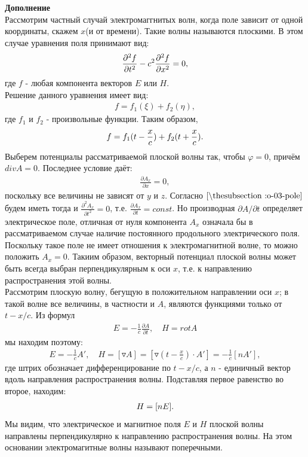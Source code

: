 ﻿\documentclass[__main__.tex]{subfiles}
\begin{document}
\textbf{Дополнение}\\
Рассмотрим частный случай электромаггнитых волн, когда поле зависит от одной координаты, скажем $x$(и от времени). Такие волны называются плоскими. В этом случае уравнения поля принимают вид:
\begin{gather}
\llabel{o-03-pole}
\frac{\partial^2f}{\partial t^2} - c^2\frac{\partial^2f}{\partial x^2} = 0,
\end{gather}
где $f$ - любая компонента векторов $E$ или $H$.\\ 
Решение данного уравнения имеет вид:
\begin{gather*}
f = f_1(\xi) + f_2(\eta),
\end{gather*}
где $f_1$ и $f_2$ - произвольные функции. Таким образом,
\begin{gather}
\llabel{o-03-f}
f = f_1(t - \frac{x}{c}) + f_2(t + \frac{x}{c}).
\end{gather}
Выберем потенциалы рассматриваемой плоской волны так, чтобы $\varphi = 0$, причём  $div A = 0$. Последнее условие даёт:
\begin{gather*}
\frac{\partial A_x}{\partial x} = 0,
\end{gather*}
поскольку все величины не зависят от $y$ и $z$. Согласно $\lref{o-03-pole}$ будем иметь тогда и $\frac{\partial^2A_x}{\partial t^2} = 0$, т.е. $\frac{\partial A_x}{\partial t} = const$. Но производная $\partial A/\partial t$ определяет электрическое поле, отличная от нуля компонента $A_x$ означала бы в рассматриваемом случае наличие постоянного продольного электрического поля. Поскольку такое поле не имеет отношения к электромагнитной волне, то можно положить $A_x = 0$.
Такиим образом, векторный потенциал плоской волны может быть всегда выбран перпендикулярным к оси $x$, т.е. к направлению распространения этой волны.\\
Рассмотрим плоскую волну, бегущую в положительном направлении оси $x$; в такой волне все величины, в частности и $A$, являются функциями только от $t - x/c$. Из формул
\begin{gather*}
E = -\frac{1}{c}\frac{\partial A}{\partial t}, \quad H = rot A
\end{gather*}
мы находим поэтому:
\begin{gather*}
E = -\frac{1}{c}A', \quad H = [\triangledown A] = [\triangledown (t - \frac{x}{c})\cdot A'] = -\frac{1}{c}[nA'],
\end{gather*}
где штрих обозначает дифференцирование по $t - x/c$, а $n$ - единичный вектор вдоль направления распространения волны. Подставляя первое равенство во второе, находим:
\begin{gather}
\llabel{o-03-H}
H = [nE].
\end{gather}
Мы видим, что электрическое и магнитное поля $E$ и $H$ плоской волны направлены перпендикулярно к направлению распространения волны. На этом основании электромагитные волны называют поперечными.\\
\end{document}
